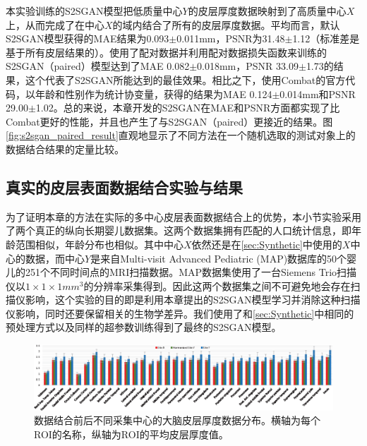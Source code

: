 本实验训练的S2SGAN模型把低质量中心$Y$的皮层厚度数据映射到了高质量中心$X$上，从而完成了在中心$X$的域内结合了所有的皮层厚度数据。平均而言，默认S2SGAN模型获得的MAE结果为0.093$\pm$0.011mm，PSNR为31.48$\pm$1.12（标准差是基于所有皮层结果的）。使用了配对数据并利用配对数据损失函数来训练的S2SGAN（paired）模型达到了MAE 0.082$\pm$0.018mm，PSNR 33.09$\pm$1.73的结果，这个代表了S2SGAN所能达到的最佳效果。相比之下，使用Combat的官方代码，以年龄和性别作为统计协变量，获得的结果为MAE 0.124$\pm$0.014mm和PSNR 29.00$\pm$1.02。总的来说，本章开发的S2SGAN在MAE和PSNR方面都实现了比Combat更好的性能，并且也产生了与S2SGAN（paired）更接近的结果。图\ref{fig:s2sgan_paired_result}直观地显示了不同方法在一个随机选取的测试对象上的数据结合结果的定量比较。


\subsection{真实的皮层表面数据结合实验与结果}
为了证明本章的方法在实际的多中心皮层表面数据结合上的优势，本小节实验采用了两个真正的纵向长期婴儿数据集。这两个数据集拥有匹配的人口统计信息，即年龄范围相似，年龄分布也相似。其中中心$X$依然还是在\ref{sec:Synthetic}中使用的$X$中心的数据，而中心$Y$是来自Multi-visit Advanced Pediatric (MAP)数据库的50个婴儿的251个不同时间点的MRI扫描数据。MAP数据集使用了一台Siemens Trio扫描仪以$1\times 1\times 1mm^3$的分辨率采集得到。因此这两个数据集之间不可避免地会存在扫描仪影响，这个实验的目的即是利用本章提出的S2SGAN模型学习并消除这种扫描仪影响，同时还要保留相关的生物学差异。我们使用了和\ref{sec:Synthetic}中相同的预处理方式以及同样的超参数训练得到了最终的S2SGAN模型。

\begin{figure}[t]
\centering
\includegraphics[width=\linewidth]{figure/s2sgan_roi_bar_realA_realB_fakeA.eps}
\caption{数据结合前后不同采集中心的大脑皮层厚度数据分布。横轴为每个ROI的名称，纵轴为ROI的平均皮层厚度值。}\label{fig:s2sgan_roi_bar_realA_realB_fakeA} 
\end{figure} 

